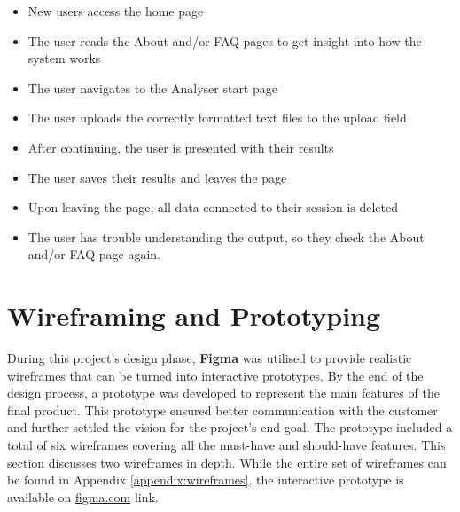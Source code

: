 \documentclass{l4proj}
\begin{document}
\begin{itemize}
    \item New users access the home page
    \item The user reads the About and/or FAQ pages to get insight into how the system works
    \item The user navigates to the Analyser start page
    \item The user uploads the correctly formatted text files to the upload field
    \item After continuing, the user is presented with their results
    \item The user saves their results and leaves the page
    \item Upon leaving the page, all data connected to their session is deleted
    \item The user has trouble understanding the output, so they check the About and/or FAQ page again.
\end{itemize}

\section{Wireframing and Prototyping}

During this project's design phase, \textbf{Figma} was utilised to provide realistic wireframes that can be turned into interactive prototypes. By the end of the design process, a prototype was developed to represent the main features of the final product. This prototype ensured better communication with the customer and further settled the vision for the project's end goal. The prototype included a total of six wireframes covering all the must-have and should-have features. This section discusses two wireframes in depth. While the entire set of wireframes can be found in Appendix \ref{appendix:wireframes}, the interactive prototype is available on \href{https://www.figma.com/proto/XElvUvEeXKuAAlMz7AxEIu/ML_QUAL_ANALYSER?node-id=1-2&scaling=scale-down&page-id=0%3A1&starting-point-node-id=1%3A2}{figma.com} link.
\end{document}
